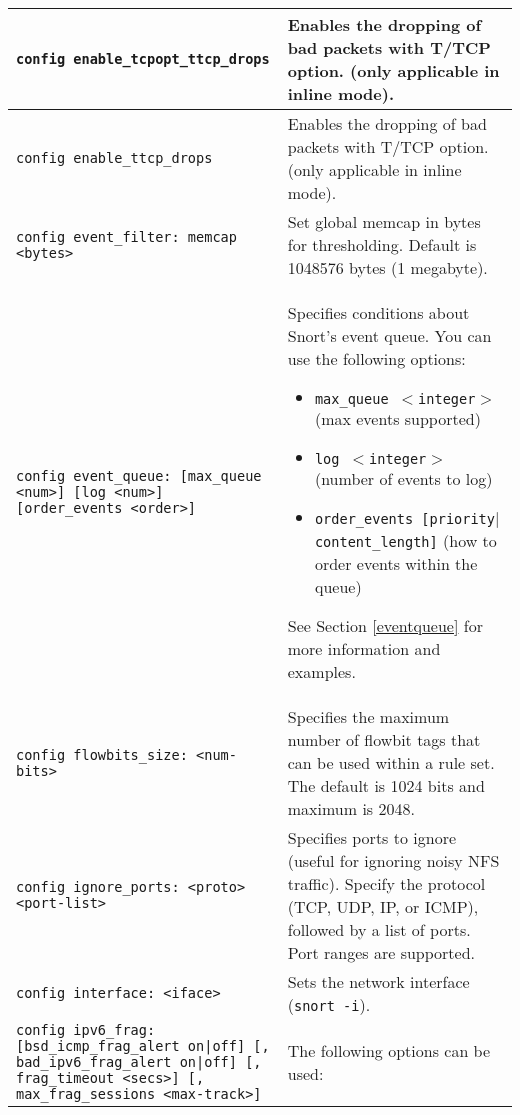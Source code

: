 \documentclass[english]{report}
\begin{document}
\begin{center}
\begin{longtable}[t]{| p{2.5in} | p{3.5in} |}
\hline
\texttt{config enable\_tcpopt\_ttcp\_drops} & Enables the dropping of bad packets with
T/TCP option. (only applicable in inline mode).\\

\hline
\texttt{config enable\_ttcp\_drops} & Enables the dropping of bad packets with T/TCP
option. (only applicable in inline mode).\\

\hline
\texttt{config event\_filter: memcap <bytes>} & Set global memcap in bytes for
thresholding. Default is 1048576 bytes (1 megabyte). \\

\hline
\texttt{config event\_queue: [max\_queue <num>] [log <num>] [order\_events
<order>]} & Specifies conditions about Snort's event queue. You can use the
following options:

\begin{itemize}
\item \texttt{max\_queue $<$integer$>$} (max events supported)
\item \texttt{log $<$integer$>$} (number of events to log) 
\item \texttt{order\_events [priority$|$content\_length]} (how to order events within the queue)
\end{itemize}

See Section \ref{eventqueue} for more information and examples.\\

\hline
\texttt{config flowbits\_size: <num-bits>} & Specifies the maximum number of
flowbit tags that can be used within a rule set.  The default is 1024 bits
and maximum is 2048. \\

\hline
\texttt{config ignore\_ports: <proto> <port-list>} & Specifies ports to ignore
(useful for ignoring noisy NFS traffic). Specify the protocol (TCP, UDP, IP, or
ICMP), followed by a list of ports. Port ranges are supported.\\

\hline
\texttt{config interface: <iface>} & Sets the network interface (\texttt{snort
-i}). \\

\hline
\texttt{config ipv6\_frag: [bsd\_icmp\_frag\_alert on|off] [,
bad\_ipv6\_frag\_alert on|off] [, frag\_timeout <secs>] [, max\_frag\_sessions
<max-track>]} & The following options can be used:

\begin{itemize}


\end{itemize}
\end{longtable}
\end{center}
\end{document}
